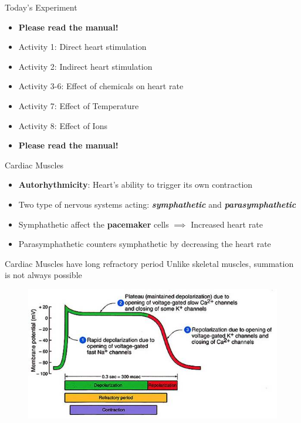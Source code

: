 \documentclass[10pt]{beamer}
\begin{document}
\begin{frame}[fragile]{Today's Experiment}

\begin{itemize}[<+-| alert@+>]
\item \textbf{Please read the manual!}
\item Activity 1: Direct heart stimulation
\item Activity 2: Indirect heart stimulation
\item Activity 3-6: Effect of chemicals on heart rate
\item Activity 7: Effect of Temperature
\item Activity 8: Effect of Ions
\item \textbf{Please read the manual!}
\end{itemize}
\end{frame}


\begin{frame}[fragile]{Cardiac Muscles}
\begin{itemize}
\item \textbf{Autorhythmicity}: Heart's ability to trigger its own contraction
\item Two type of nervous systems acting: \textbf{\textit{symphathetic}} and \textbf{\textit{parasymphathetic}}
\item Symphathetic affect the \textbf{pacemaker} cells $\implies$ Increased heart rate
\item Parasymphathetic counters symphathetic by decreasing the heart rate
\end{itemize}
\end{frame}

\begin{frame}[fragile]{Cardiac Muscles have long refractory period}
Unlike skeletal muscles, summation is not always possible
\begin{figure}
\includegraphics[width=\linewidth]{potential}
\end{figure}
\end{frame}
\end{document}
